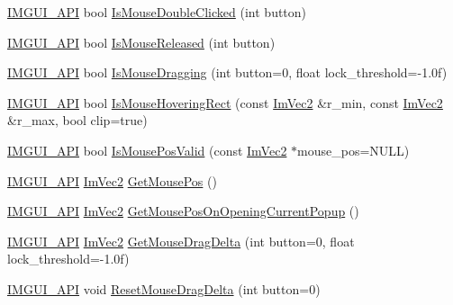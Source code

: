 \begin{DoxyCompactItemize}
\mbox{\hyperlink{imgui_8h_a43829975e84e45d1149597467a14bbf5}{I\+M\+G\+U\+I\+\_\+\+A\+PI}} bool \mbox{\hyperlink{namespace_im_gui_a0d39701e7a0d7629e1b96b68e935542e}{Is\+Mouse\+Double\+Clicked}} (int button)
\item 
\mbox{\hyperlink{imgui_8h_a43829975e84e45d1149597467a14bbf5}{I\+M\+G\+U\+I\+\_\+\+A\+PI}} bool \mbox{\hyperlink{namespace_im_gui_aef586112e8d1eb26ce28198d9efe9bba}{Is\+Mouse\+Released}} (int button)
\item 
\mbox{\hyperlink{imgui_8h_a43829975e84e45d1149597467a14bbf5}{I\+M\+G\+U\+I\+\_\+\+A\+PI}} bool \mbox{\hyperlink{namespace_im_gui_a7905828a024c6c005fa1887e62235ca4}{Is\+Mouse\+Dragging}} (int button=0, float lock\+\_\+threshold=-\/1.\+0f)
\item 
\mbox{\hyperlink{imgui_8h_a43829975e84e45d1149597467a14bbf5}{I\+M\+G\+U\+I\+\_\+\+A\+PI}} bool \mbox{\hyperlink{namespace_im_gui_ae0b8ea0e06c457316d6aed6c5b2a1c25}{Is\+Mouse\+Hovering\+Rect}} (const \mbox{\hyperlink{struct_im_vec2}{Im\+Vec2}} \&r\+\_\+min, const \mbox{\hyperlink{struct_im_vec2}{Im\+Vec2}} \&r\+\_\+max, bool clip=true)
\item 
\mbox{\hyperlink{imgui_8h_a43829975e84e45d1149597467a14bbf5}{I\+M\+G\+U\+I\+\_\+\+A\+PI}} bool \mbox{\hyperlink{namespace_im_gui_a22d482190e8f549d5904aded1c6f7778}{Is\+Mouse\+Pos\+Valid}} (const \mbox{\hyperlink{struct_im_vec2}{Im\+Vec2}} $\ast$mouse\+\_\+pos=N\+U\+LL)
\item 
\mbox{\hyperlink{imgui_8h_a43829975e84e45d1149597467a14bbf5}{I\+M\+G\+U\+I\+\_\+\+A\+PI}} \mbox{\hyperlink{struct_im_vec2}{Im\+Vec2}} \mbox{\hyperlink{namespace_im_gui_abf11873349874c5d302861583c00d451}{Get\+Mouse\+Pos}} ()
\item 
\mbox{\hyperlink{imgui_8h_a43829975e84e45d1149597467a14bbf5}{I\+M\+G\+U\+I\+\_\+\+A\+PI}} \mbox{\hyperlink{struct_im_vec2}{Im\+Vec2}} \mbox{\hyperlink{namespace_im_gui_ac1ba5d7b76e11d47660b32dc851afd2f}{Get\+Mouse\+Pos\+On\+Opening\+Current\+Popup}} ()
\item 
\mbox{\hyperlink{imgui_8h_a43829975e84e45d1149597467a14bbf5}{I\+M\+G\+U\+I\+\_\+\+A\+PI}} \mbox{\hyperlink{struct_im_vec2}{Im\+Vec2}} \mbox{\hyperlink{namespace_im_gui_a94b8aecab8a4128145fea1ad7d381197}{Get\+Mouse\+Drag\+Delta}} (int button=0, float lock\+\_\+threshold=-\/1.\+0f)
\item 
\mbox{\hyperlink{imgui_8h_a43829975e84e45d1149597467a14bbf5}{I\+M\+G\+U\+I\+\_\+\+A\+PI}} void \mbox{\hyperlink{namespace_im_gui_aa03f31a184cafdf506feb2e8ba07f91e}{Reset\+Mouse\+Drag\+Delta}} (int button=0)
\item 

\end{DoxyCompactItemize}
